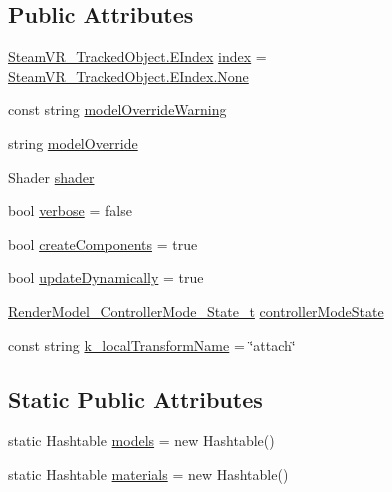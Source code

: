 \subsection*{Public Attributes}
\begin{DoxyCompactItemize}
\item 
\mbox{\hyperlink{class_valve_1_1_v_r_1_1_steam_v_r___tracked_object_a3d437894eff0bfc81eeb21a8c478413e}{Steam\+V\+R\+\_\+\+Tracked\+Object.\+E\+Index}} \mbox{\hyperlink{class_valve_1_1_v_r_1_1_steam_v_r___render_model_af732541e751210a72fd7ea793566d940}{index}} = \mbox{\hyperlink{class_valve_1_1_v_r_1_1_steam_v_r___tracked_object_a3d437894eff0bfc81eeb21a8c478413ea6adf97f83acf6453d4a6a4b1070f3754}{Steam\+V\+R\+\_\+\+Tracked\+Object.\+E\+Index.\+None}}
\item 
const string \mbox{\hyperlink{class_valve_1_1_v_r_1_1_steam_v_r___render_model_ab459a749b89d3f4f12339ef618177344}{model\+Override\+Warning}}
\item 
string \mbox{\hyperlink{class_valve_1_1_v_r_1_1_steam_v_r___render_model_a2980ac7d5745563e149a6622daac0578}{model\+Override}}
\item 
Shader \mbox{\hyperlink{class_valve_1_1_v_r_1_1_steam_v_r___render_model_a295413d096843e816feec34051948d5d}{shader}}
\item 
bool \mbox{\hyperlink{class_valve_1_1_v_r_1_1_steam_v_r___render_model_a6e1361eb79e5e7d2907239b69d8c2747}{verbose}} = false
\item 
bool \mbox{\hyperlink{class_valve_1_1_v_r_1_1_steam_v_r___render_model_ad8097606e4229b87628de3bd9c1b1740}{create\+Components}} = true
\item 
bool \mbox{\hyperlink{class_valve_1_1_v_r_1_1_steam_v_r___render_model_a31f89a1d33b360df1c448395f42fd0ad}{update\+Dynamically}} = true
\item 
\mbox{\hyperlink{struct_valve_1_1_v_r_1_1_render_model___controller_mode___state__t}{Render\+Model\+\_\+\+Controller\+Mode\+\_\+\+State\+\_\+t}} \mbox{\hyperlink{class_valve_1_1_v_r_1_1_steam_v_r___render_model_ac6b2a701413243d24c2dd40bfbe8b845}{controller\+Mode\+State}}
\item 
const string \mbox{\hyperlink{class_valve_1_1_v_r_1_1_steam_v_r___render_model_a1dc259cc2c45275417739bf0f9fd75f9}{k\+\_\+local\+Transform\+Name}} = \char`\"{}attach\char`\"{}
\end{DoxyCompactItemize}
\subsection*{Static Public Attributes}
\begin{DoxyCompactItemize}
\item 
static Hashtable \mbox{\hyperlink{class_valve_1_1_v_r_1_1_steam_v_r___render_model_a637b914e124022351bbb1976775d9afb}{models}} = new Hashtable()
\item 
static Hashtable \mbox{\hyperlink{class_valve_1_1_v_r_1_1_steam_v_r___render_model_a96489732de88e8abb28dbb430a729a87}{materials}} = new Hashtable()
\end{DoxyCompactItemize}
